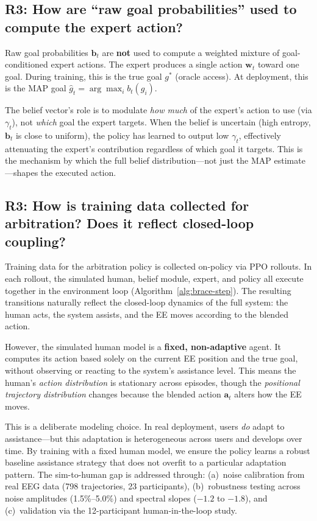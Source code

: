 \documentclass[11pt]{article}
\newcommand{\bvec}{\mathbf{b}_t}
\newcommand{\wvec}{\mathbf{w}_t}
\newcommand{\avec}{\mathbf{a}_t}
\begin{document}
\subsection{R3: How are ``raw goal probabilities'' used to compute the expert action?}

Raw goal probabilities $\bvec$ are \textbf{not} used to compute a weighted mixture of goal-conditioned expert actions.  The expert produces a single action $\wvec$ toward one goal.  During training, this is the true goal $g^*$ (oracle access).  At deployment, this is the MAP goal $\hat{g}_t = \arg\max_i b_t(g_i)$.

The belief vector's role is to modulate \emph{how much} of the expert's action to use (via $\gamma_t$), not \emph{which} goal the expert targets.  When the belief is uncertain (high entropy, $\bvec$ is close to uniform), the policy has learned to output low $\gamma_t$, effectively attenuating the expert's contribution regardless of which goal it targets.  This is the mechanism by which the full belief distribution---not just the MAP estimate---shapes the executed action.

\subsection{R3: How is training data collected for arbitration? Does it reflect closed-loop coupling?}

Training data for the arbitration policy is collected on-policy via PPO rollouts.  In each rollout, the simulated human, belief module, expert, and policy all execute together in the environment loop (Algorithm~\ref{alg:brace-step}).  The resulting transitions naturally reflect the closed-loop dynamics of the full system: the human acts, the system assists, and the EE moves according to the blended action.

However, the simulated human model is a \textbf{fixed, non-adaptive} agent.  It computes its action based solely on the current EE position and the true goal, without observing or reacting to the system's assistance level.  This means the human's \emph{action distribution} is stationary across episodes, though the \emph{positional trajectory distribution} changes because the blended action $\avec$ alters how the EE moves.

This is a deliberate modeling choice.  In real deployment, users \emph{do} adapt to assistance---but this adaptation is heterogeneous across users and develops over time.  By training with a fixed human model, we ensure the policy learns a robust baseline assistance strategy that does not overfit to a particular adaptation pattern.  The sim-to-human gap is addressed through: (a)~noise calibration from real EEG data (798 trajectories, 23 participants), (b)~robustness testing across noise amplitudes (1.5\%--5.0\%) and spectral slopes ($-1.2$ to $-1.8$), and (c)~validation via the 12-participant human-in-the-loop study.
\end{document}
